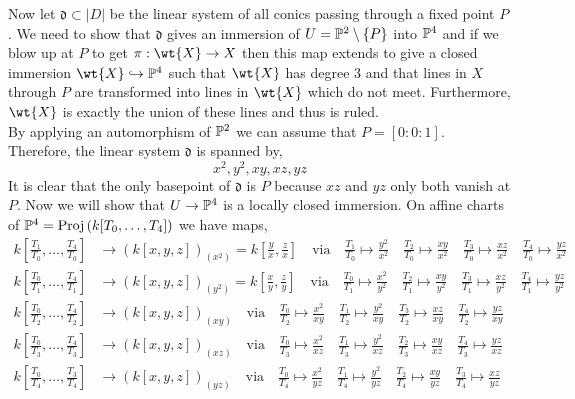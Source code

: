\documentclass[12pt]{article}
\begin{document}
\begin{enumerate}
Now let $\mathfrak{d} \subset |D|$ be the linear system of all conics passing through a fixed point $P$. We need to show that $\mathfrak{d}$ gives an immersion of $U = \P^2 \setminus \{ P \}$ into $\P^4$ and if we blow up at $P$ to get $\pi : \wt{X} \to X$ then this map extends to give a closed immersion $\wt{X} \embed \P^4$ such that $\wt{X}$ has degree $3$ and that lines in $X$ through $P$ are transformed into lines in $\wt{X}$ which do not meet. Furthermore, $\wt{X}$ is exactly the union of these lines and thus is ruled.
\bigskip\\
By applying an automorphism of $\P^2$ we can assume that $P = [0 : 0 : 1]$. Therefore, the linear system $\mathfrak{d}$ is spanned by,
\[ x^2, y^2, xy, xz, yz \]
It is clear that the only basepoint of $\mathfrak{d}$ is $P$ because $xz$ and $yz$ only both vanish at $P$. Now we will show that $U \to \P^4$ is a locally closed immersion. On affine charts of $\P^4 = \Proj{k[T_0, \dots, T_4]}$ we have maps,
\begin{align*}
k[\tfrac{T_1}{T_0}, \dots, \tfrac{T_4}{T_0}] & \to (k[x,y,z])_{(x^2)} = k[\tfrac{y}{x}, \tfrac{z}{x}] \quad \text{via} \quad \tfrac{T_1}{T_0} \mapsto \tfrac{y^2}{x^2} \quad \tfrac{T_2}{T_0} \mapsto \tfrac{xy}{x^2} \quad \tfrac{T_3}{T_0} \mapsto \tfrac{xz}{x^2} \quad \tfrac{T_4}{T_0} \mapsto \tfrac{yz}{x^2} 
\\
k[\tfrac{T_0}{T_1}, \dots, \tfrac{T_4}{T_1}] & \to (k[x,y,z])_{(y^2)} = k[\tfrac{x}{y}, \tfrac{z}{y}] \quad \text{via} \quad \tfrac{T_0}{T_1} \mapsto \tfrac{x^2}{y^2} \quad \tfrac{T_2}{T_1} \mapsto \tfrac{xy}{y^2} \quad \tfrac{T_3}{T_1} \mapsto \tfrac{xz}{y^2} \quad \tfrac{T_4}{T_1} \mapsto \tfrac{yz}{y^2} 
\\
k[\tfrac{T_0}{T_2}, \dots, \tfrac{T_4}{T_2}] & \to (k[x,y,z])_{(xy)} \quad \text{via} \quad \tfrac{T_0}{T_2} \mapsto \tfrac{x^2}{xy} \quad \tfrac{T_1}{T_2} \mapsto \tfrac{y^2}{xy} \quad \tfrac{T_3}{T_2} \mapsto \tfrac{xz}{xy} \quad \tfrac{T_4}{T_2} \mapsto \tfrac{yz}{xy}  
\\
k[\tfrac{T_0}{T_3}, \dots, \tfrac{T_4}{T_3}] & \to (k[x,y,z])_{(xz)}  \quad \text{via} \quad \tfrac{T_0}{T_3} \mapsto \tfrac{x^2}{xz} \quad \tfrac{T_1}{T_3} \mapsto \tfrac{y^2}{xz} \quad \tfrac{T_2}{T_3} \mapsto \tfrac{xy}{xz} \quad \tfrac{T_4}{T_3} \mapsto \tfrac{yz}{xz} 
\\
k[\tfrac{T_0}{T_4}, \dots, \tfrac{T_3}{T_4}] & \to (k[x,y,z])_{(yz)} \quad \text{via} \quad \tfrac{T_0}{T_4} \mapsto \tfrac{x^2}{yz} \quad \tfrac{T_1}{T_4} \mapsto \tfrac{y^2}{yz} \quad \tfrac{T_2}{T_4} \mapsto \tfrac{xy}{yz} \quad \tfrac{T_3}{T_4} \mapsto \tfrac{xz}{yz} 

\end{align*}
\end{enumerate}
\end{document}

